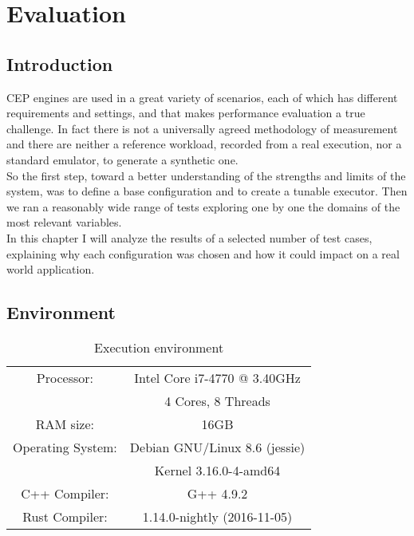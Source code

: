 \chapter{Evaluation}

\section{Introduction}
CEP engines are used in a great variety of scenarios, each of which has different requirements and settings, and that makes performance evaluation a true challenge. In fact there is not a universally agreed methodology of measurement and there are neither a reference workload, recorded from a real execution, nor a standard emulator, to generate a synthetic one.\\
So the first step, toward a better understanding of the strengths and limits of the system, was to define a base configuration and to create a tunable executor. Then we ran a reasonably wide range of tests exploring one by one the domains of the most relevant variables.\\
In this chapter I will analyze the results of a selected number of test cases, explaining why each configuration was chosen and how it could impact on a real world application.

\section{Environment}
\begin{table}[h]
  \begin{center}
    \begin{tabular}{|c|c|}
      \hline
      Processor: 		& Intel Core i7-4770 @ 3.40GHz\\
                        & 4 Cores, 8 Threads\\ 
      \hline
      RAM size: 		& 16GB\\
      \hline
      Operating System: & Debian GNU/Linux 8.6 (jessie)\\
                        & Kernel 3.16.0-4-amd64\\
      \hline
      C++ Compiler:     & G++ 4.9.2\\
      \hline
      Rust Compiler:    & 1.14.0-nightly (2016-11-05)\\
      \hline
    \end{tabular}
    \caption{Execution environment}
  \end{center}
\end{table}

